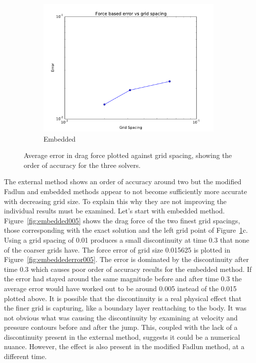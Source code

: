 \begin{figure}[H]
	\begin{subfigure}{0.5\textwidth}
		\includegraphics[width=\linewidth]{error_embedded}
		\caption{Embedded}
	\end{subfigure}
	\caption{Average error in drag force plotted against grid spacing, showing the order of accuracy for the three solvers.}
	\label{fig:cyerror}
\end{figure}

The external method shows an order of accuracy around two but the modified Fadlun and embedded methods appear to not become sufficiently more accurate with decreasing grid size. 
To explain this why they are not improving the individual results must be examined. 
Let's start with embedded method. 
Figure~\ref{fig:embedded005} shows the drag force of the two finest grid spacings, those corresponding with the exact solution and the left grid point of Figure~\ref{fig:cyerror}c. 
Using a grid spacing of 0.01 produces a small discontinuity at time 0.3 that none of the coarser grids have. 
The force error of grid size 0.015625 is plotted in Figure~\ref{fig:embeddederror005}. 
The error is dominated by the discontinuity after time 0.3 which causes poor order of accuracy results for the embedded method. 
If the error had stayed around the same magnitude before and after time 0.3 the average error would have worked out to be around 0.005 instead of the 0.015 plotted above. 
It is possible that the discontinuity is a real physical effect that the finer grid is capturing, like a boundary layer reattaching to the body. 
It was not obvious what was causing the discontinuity by examining at velocity and pressure contours before and after the jump. 
This, coupled with the lack of a discontinuity present in the external method, suggests it could be a numerical nuance. 
However, the effect is also present in the modified Fadlun method, at a different time.


